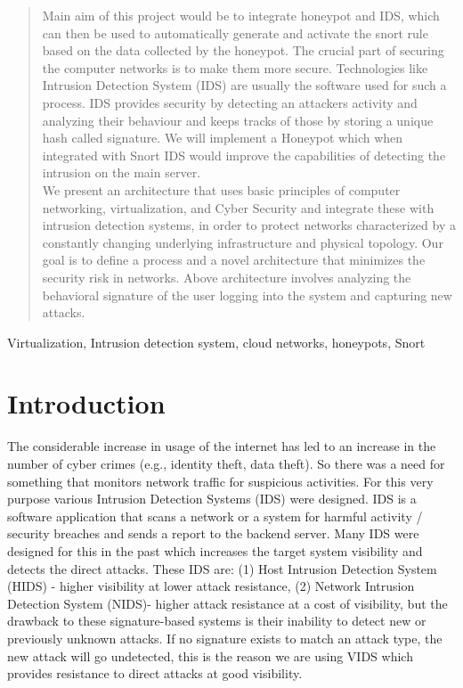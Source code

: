 \documentclass[conference]{IEEEtran}
\begin{document}
\maketitle
\newpage
\begin{abstract}

Main aim of this project would be to integrate honeypot and IDS, which can then be used to automatically generate and activate the snort rule based on the data collected by the honeypot. The crucial part of securing the computer networks is to make them more secure. Technologies like Intrusion Detection System (IDS) are usually the software used for such a process. IDS provides security by detecting an attackers activity and analyzing their behaviour and keeps tracks of those by storing a unique hash called signature. We will implement a Honeypot which when integrated with Snort IDS would improve the capabilities of detecting the intrusion on the main server. \\
We present an architecture that uses basic principles of computer networking, virtualization, and Cyber Security and integrate these with intrusion detection systems, in order to protect networks characterized by a constantly changing underlying infrastructure and physical topology. Our goal is to define a process and a novel architecture that minimizes the security risk in networks. Above architecture involves analyzing the behavioral signature of the user logging into the system and capturing new attacks.
\end{abstract}

\begin{IEEEkeywords}
Virtualization, Intrusion detection system, cloud networks, honeypots, Snort
\end{IEEEkeywords}

\section{Introduction}

The considerable increase in usage of the internet has led to an increase in the number of cyber crimes (e.g., identity theft, data theft). So there was a need for something that monitors network traffic for suspicious activities. For this very purpose various Intrusion Detection Systems (IDS) were designed.  IDS is a software application that scans a network or a system for harmful activity / security breaches and sends a report to the backend server. Many IDS were designed for this in the past which increases the target system visibility and detects the direct attacks. These IDS are: (1) Host Intrusion Detection System (HIDS) - higher visibility at lower attack resistance, (2) Network Intrusion Detection System (NIDS)- higher attack resistance at a cost of visibility, but the drawback to these signature-based systems is their inability to detect new or previously unknown attacks. If no signature exists to match an attack type, the new attack will go undetected, this is the reason we are using VIDS which provides resistance to direct attacks at good visibility.\\
\end{document}
